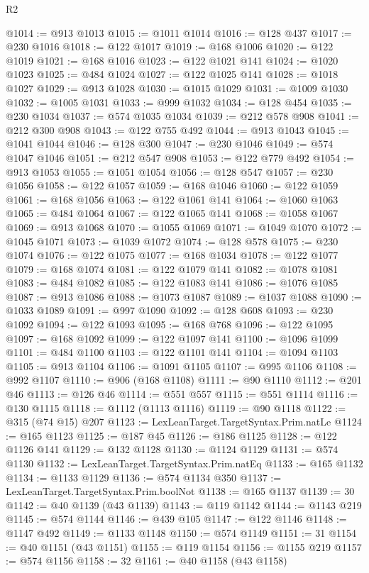 \begin{lexlean}{R2}
\begin{coremodule}
{{{{{{{{{{{{{{{{{{{{{{{{{{{{{{{{{{{{{{{{{{{{{{{{{{{{{{{{{{{{{{{{{{{{{{{{{{{{{{{{{{{{{{{{{{{{@1014 := @913 @1013
@1015 := @1011 @1014
@1016 := @128 @437
@1017 := @230 @1016
@1018 := @122 @1017
@1019 := @168 @1006
@1020 := @122 @1019
@1021 := @168 @1016
@1023 := @122 @1021 @141
@1024 := @1020 @1023
@1025 := @484 @1024
@1027 := @122 @1025 @141
@1028 := @1018 @1027
@1029 := @913 @1028
@1030 := @1015 @1029
@1031 := @1009 @1030
@1032 := @1005 @1031
@1033 := @999 @1032
@1034 := @128 @454
@1035 := @230 @1034
@1037 := @574 @1035 @1034
@1039 := @212 @578 @908
@1041 := @212 @300 @908
@1043 := @122 @755 @492
@1044 := @913 @1043
@1045 := @1041 @1044
@1046 := @128 @300
@1047 := @230 @1046
@1049 := @574 @1047 @1046
@1051 := @212 @547 @908
@1053 := @122 @779 @492
@1054 := @913 @1053
@1055 := @1051 @1054
@1056 := @128 @547
@1057 := @230 @1056
@1058 := @122 @1057
@1059 := @168 @1046
@1060 := @122 @1059
@1061 := @168 @1056
@1063 := @122 @1061 @141
@1064 := @1060 @1063
@1065 := @484 @1064
@1067 := @122 @1065 @141
@1068 := @1058 @1067
@1069 := @913 @1068
@1070 := @1055 @1069
@1071 := @1049 @1070
@1072 := @1045 @1071
@1073 := @1039 @1072
@1074 := @128 @578
@1075 := @230 @1074
@1076 := @122 @1075
@1077 := @168 @1034
@1078 := @122 @1077
@1079 := @168 @1074
@1081 := @122 @1079 @141
@1082 := @1078 @1081
@1083 := @484 @1082
@1085 := @122 @1083 @141
@1086 := @1076 @1085
@1087 := @913 @1086
@1088 := @1073 @1087
@1089 := @1037 @1088
@1090 := @1033 @1089
@1091 := @997 @1090
@1092 := @128 @608
@1093 := @230 @1092
@1094 := @122 @1093
@1095 := @168 @768
@1096 := @122 @1095
@1097 := @168 @1092
@1099 := @122 @1097 @141
@1100 := @1096 @1099
@1101 := @484 @1100
@1103 := @122 @1101 @141
@1104 := @1094 @1103
@1105 := @913 @1104
@1106 := @1091 @1105
@1107 := @995 @1106
@1108 := @992 @1107
@1110 := @906 (@168 @1108)
@1111 := @90 @1110
@1112 := @201 @46
@1113 := @126 @46
@1114 := @551 @557
@1115 := @551 @1114
@1116 := @130 @1115
@1118 := @1112 (@1113 @1116)
@1119 := @90 @1118
@1122 := @315 (@74 @15) @207
@1123 := LexLeanTarget.TargetSyntax.Prim.natLe
@1124 := @165 @1123
@1125 := @187 @45
@1126 := @186 @1125
@1128 := @122 @1126 @141
@1129 := @132 @1128
@1130 := @1124 @1129
@1131 := @574 @1130
@1132 := LexLeanTarget.TargetSyntax.Prim.natEq
@1133 := @165 @1132
@1134 := @1133 @1129
@1136 := @574 @1134 @350
@1137 := LexLeanTarget.TargetSyntax.Prim.boolNot
@1138 := @165 @1137
@1139 := 30
@1142 := @40 @1139 (@43 @1139)
@1143 := @119 @1142
@1144 := @1143 @219
@1145 := @574 @1144
@1146 := @439 @105
@1147 := @122 @1146
@1148 := @1147 @492
@1149 := @1133 @1148
@1150 := @574 @1149
@1151 := 31
@1154 := @40 @1151 (@43 @1151)
@1155 := @119 @1154
@1156 := @1155 @219
@1157 := @574 @1156
@1158 := 32
@1161 := @40 @1158 (@43 @1158)
}}}}}}}}}}}}}}}}}}}}}}}}}}}}}}}}}}}}}}}}}}}}}}}}}}}}}}}}}}}}}}}}}}}}}}}}}}}}}}}}}}}}}}}}}}}}
\end{coremodule}
\end{lexlean}
